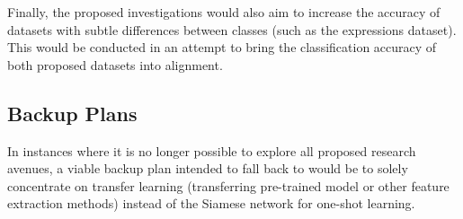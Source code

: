 \documentclass{article}
\begin{document}
Finally, the proposed investigations would also aim to increase the accuracy of datasets with subtle differences between classes (such as the expressions dataset). This would be conducted in an attempt to bring the classification accuracy of both proposed datasets into alignment.

\subsection{Backup Plans}
\label{sec:plans}

In instances where it is no longer possible to explore all proposed research avenues, a viable backup plan intended to fall back to would be to solely concentrate on transfer learning (transferring pre-trained model or other feature extraction methods) instead of the Siamese network for one-shot learning. 



\end{document}
